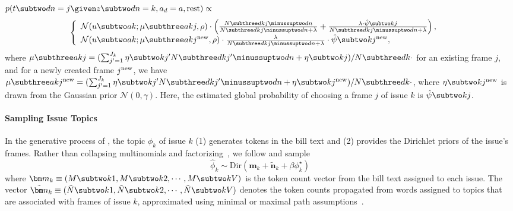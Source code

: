 $p(t \subtwo dn = j \given z \subtwo dn = k, a_d =
a, \mbox{rest}) \propto$
\begin{equation}
\left\{
  \begin{array}{ll}
    \mathcal{N}(u \subtwo ak; \mu \subthree akj, \rho) \cdot
     \left(\frac{N \subthree dkj \minussuptwo dn}{N \subthree dkj \minussuptwo dn + \lambda} +
        \frac{\lambda \cdot \hat{\psi} \subtwo kj}{N \subthree dkj \minussuptwo dn + \lambda }
        \right),
     & \\
     \mathcal{N}(u \subtwo ak; \mu \subthree ak{j^{\mbox{\scriptsize new}}}, \rho) \cdot
     \frac{\lambda}{N \subthree dkj \minussuptwo dn + \lambda} \cdot
        \hat{\psi} \subtwo k{j^{\mbox{\scriptsize new}}}
        
        ,
     &
  \end{array}
\right.
\label{eqn:c6_sample_t}
\end{equation}
where $\mu \subthree akj = (\sum_{j'=1}^{J_k} \eta \subtwo k{j'} N \subthree dk{j'} \minussuptwo dn
+ \eta \subtwo kj) /  N \subthree dk{\cdot}$ for an existing frame $j$, and for a newly created
frame $j^{\mbox{\scriptsize new}}$, we have $\mu \subthree ak{j^{\mbox{\scriptsize new}}} =
(\sum_{j'=1}^{J_k} \eta \subtwo k{j'} N \subthree dk{j'} \minussuptwo dn + \eta \subtwo
k{j^{\mbox{\scriptsize new}}}) /  N \subthree dk{\cdot}$, where $\eta \subtwo
k{j^{\mbox{\scriptsize new}}}$ is drawn from the Gaussian prior $\mathcal{N}(0, \gamma)$. Here, the
estimated global probability of choosing a frame $j$ of issue $k$ is $\hat{\psi} \subtwo kj$. 


\paragraph{Sampling Issue Topics}

In the generative process of \name{}, the topic $\phi_k$ of issue $k$ (1)
generates tokens in the bill text and (2) provides the Dirichlet priors of the
issue's frames. Rather than collapsing multinomials and factorizing~\cite{hu-12:fttm},
we follow  and sample
\begin{equation}
  \hat{\phi}_k \sim \mbox{Dir} (\bm m_k + \tilde{\bm n}_k + \beta \phi_k^{\star})
  \label{eq:phi_samp}
\end{equation}
where $\bm m_k \equiv (M \subtwo k1, M \subtwo k2, \cdots, M \subtwo
kV)$ is the token count vector from the bill text assigned to each
issue. The vector $\tilde{\bm n}_k \equiv (\tilde{N} \subtwo k1,
\tilde{N} \subtwo k2, \cdots, \tilde{N} \subtwo kV)$ denotes the token
counts propagated from words assigned to topics that are associated
with frames of issue $k$, approximated using minimal or maximal path
assumptions~\cite{Cowans:PhD06,Wallach:PhD08}.

